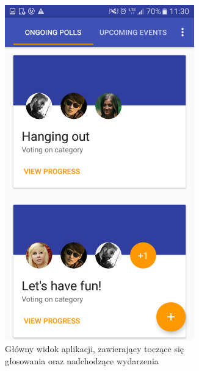 \documentclass[10pt,a4paper]{article}
\begin{document}
\begin{figure}
	\centering
	\begin{subfigure}[t]{0.4\textwidth}
		\centering
		\includegraphics[width=0.9\textwidth]{screen1.png}
		\caption{Główny widok aplikacji, zawierający toczące się głosowania oraz nadchodzące
		wydarzenia}
	\end{subfigure}
	\hfill
	\begin{subfigure}[t]{0.4\textwidth}
		\centering

\end{subfigure}
\end{figure}
\end{document}
